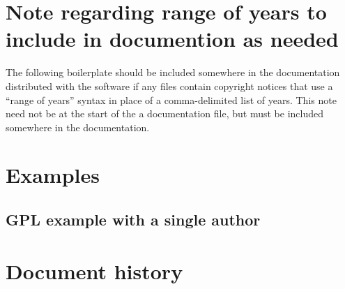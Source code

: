 \documentclass[10pt,a4paper]{article}
\begin{document}
\section{Note regarding range of years to include in documention as needed}
\label{appendix:range.of.years}
The following boilerplate should be included somewhere in the 
documentation distributed with the software if any files contain copyright 
notices that use a ``range of years'' syntax in place of a comma-delimited 
list of years. This note need not be at the start of the a documentation file, 
but must be included somewhere in the documentation. 

\begin{boilerplate}

\end{boilerplate}



\section{Examples}
\label{appendix:examples}

\subsection{GPL example with a single author}
\begin{boilerplate}

\end{boilerplate}




\section*{Document history}
\end{document}
